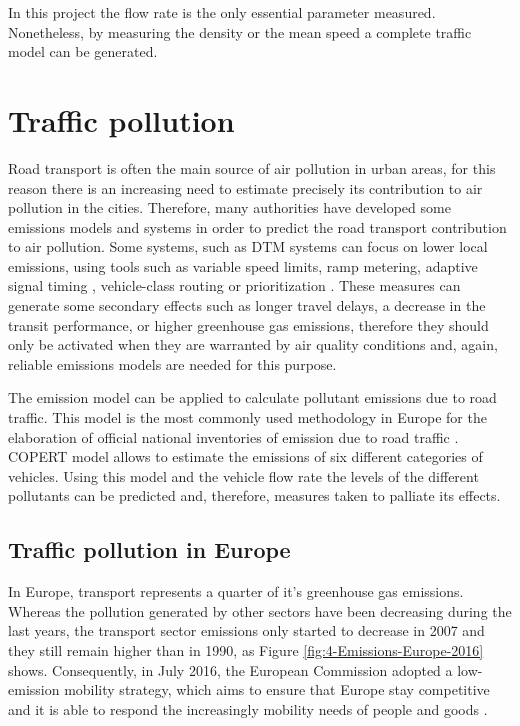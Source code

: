 In this project the flow rate is the only essential parameter measured. Nonetheless, by measuring the density or the mean speed a complete traffic model can be generated.


\section{Traffic pollution}

Road transport is often the main source of air pollution in urban areas, for this reason there is an increasing need to estimate precisely its contribution to air pollution in the cities. Therefore, many authorities have developed some emissions models and systems in order to predict the road transport contribution to air pollution. Some systems, such as \ac{DTM} systems can focus on lower local emissions, using tools such as variable speed limits, ramp metering, adaptive signal timing \cite{MK10}, vehicle-class routing or prioritization \cite{ZDHB09}. These measures can generate some secondary effects such as longer travel delays, a decrease in the transit performance, or higher greenhouse gas emissions, therefore they should only be activated when they are warranted by air quality conditions \cite{EMA09} and, again, reliable emissions models are needed for this purpose. 

The  emission model \cite{NS16} can be applied to calculate pollutant emissions due to road traffic. This model is the most commonly used methodology in Europe for the elaboration of official national inventories of emission due to road traffic \cite{Zaldei2017531}. COPERT model allows to estimate the emissions of six different categories of vehicles. Using this model and the vehicle flow rate the levels of the different pollutants can be predicted and, therefore, measures taken to palliate its effects.

\subsection{Traffic pollution in Europe}
In Europe, transport represents a quarter of it's greenhouse gas emissions. Whereas the pollution generated by other sectors have been decreasing during the last years, the transport sector emissions only started to decrease in 2007 and they still remain higher than in 1990, as Figure \ref{fig:4-Emissions-Europe-2016} shows. Consequently, in July 2016, the European Commission adopted a low-emission mobility strategy, which aims to ensure that Europe stay competitive and it is able to respond the increasingly mobility needs of people and goods \cite{EuStrat}. 

